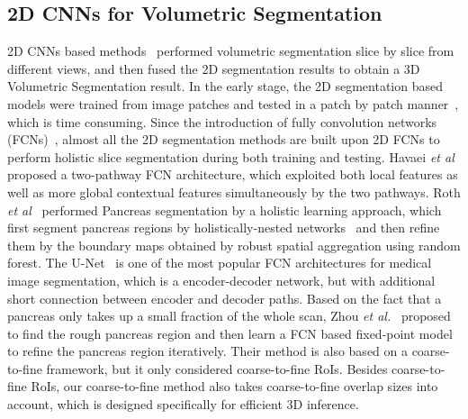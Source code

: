 \documentclass[10pt,twocolumn,letterpaper]{article}
\begin{document}
\subsection{2D CNNs for Volumetric Segmentation}
2D CNNs based methods~\cite{roth2015deeporgan}\cite{roth2016spatial}\cite{HavaeiDWBCBPJL17}\cite{MoeskopsWVGLVI17}\cite{ronneberger2015u} performed volumetric segmentation slice by slice from different views, and then fused the 2D segmentation results to obtain a 3D Volumetric Segmentation result. In the early stage, the 2D segmentation based models were trained from image patches and tested in a patch by patch manner~\cite{roth2015deeporgan}, which is time consuming. Since the introduction of fully convolution networks (FCNs)~\cite{LongSD15}, almost all the 2D segmentation methods are built upon 2D FCNs to perform holistic slice segmentation during both training and testing. Havaei \textit{et al}~\cite{HavaeiDWBCBPJL17} proposed a two-pathway FCN architecture, which exploited both local features as well as more global contextual features simultaneously by the two pathways. Roth \textit{et al}~\cite{roth2016spatial} performed Pancreas segmentation by a holistic learning approach, which first segment pancreas regions by holistically-nested networks~\cite{XieT15} and then refine them by the boundary maps obtained by robust spatial aggregation using random forest. The U-Net~\cite{ronneberger2015u} is one of the most popular FCN architectures for medical image segmentation, which is a encoder-decoder network, but with additional short connection between encoder and decoder paths. Based on the fact that a pancreas only takes up a small fraction of the whole scan, Zhou \emph{et al.}~\cite{zhou2017fixed} proposed to find the rough pancreas region and then learn a FCN based fixed-point model to refine the pancreas region iteratively. Their method is also based on a coarse-to-fine framework, but it only considered coarse-to-fine RoIs. Besides coarse-to-fine RoIs, our coarse-to-fine method also takes coarse-to-fine overlap sizes into account, which is designed specifically for efficient 3D inference. 
\end{document}
